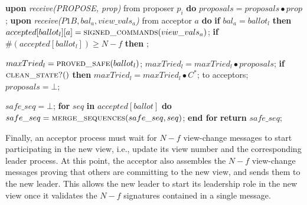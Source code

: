 \begin{algorithm}
\begin{multicols}{2}
\begin{algorithmic}[1]
			\State
			\State \textbf{upon} \textit{receive(PROPOSE, prop)} from proposer $p_i$ \textbf{do} 
			\State \hspace{\algorithmicindent} $proposals = proposals \bullet prop$;
			\State
			\State \textbf{upon} \textit{receive($P1B, bal_a,view\_vals_a$)} from acceptor $a$ \textbf{do}
			\State \hspace{\algorithmicindent} \textbf{if} $bal_a = ballot_l$ \textbf{then}
			\State \hspace{\algorithmicindent}\hspace{\algorithmicindent} $accepted[ballot_l][a] = \Call{signed\_commands}{view\_vals_a}$;
			\State
			\State \hspace{\algorithmicindent}\hspace{\algorithmicindent} \textbf{if} $\#(accepted[ballot_l]) \geq N-f$ \textbf{then} 
			\State \hspace{\algorithmicindent}\hspace{\algorithmicindent}\hspace{\algorithmicindent} ;
			
			\State
			\State $maxTried_l = \Call{proved\_safe}{ballot_l}$;
			\State $maxTried_l = maxTried_l \bullet proposals$;
			\State \textbf{if} $\Call{clean\_state?}{ }$ \textbf{then}
			\State \hspace{\algorithmicindent} $maxTried_l = maxTried_l \bullet C^*$;
			\State {} to acceptors;
			\State $proposals = \bot$;
			\EndFunction
			
			\State
			\State $safe\_seq = \bot$;
			\State \textbf{for} $seq$ \textbf{in} $accepted[ballot]$ \textbf{do}
			\State \hspace{\algorithmicindent} $safe\_seq = \Call{merge\_sequences}{safe\_seq, seq}$;
			\State \textbf{end for}
			\State \textbf{return} $safe\_seq$;
			\EndFunction		
		\end{algorithmic}
	\end{multicols}
	\vspace*{-.4cm}
\end{algorithm}

Finally, an acceptor process must wait for $N-f$ view-change messages to start participating in the new view, i.e., update its view number and the corresponding leader process. At this point, the acceptor also assembles the $N-f$ view-change messages proving that others are committing to the new view, and sends them to the new leader. This allows the new leader to start its leadership role in the new view once it validates the $N-f$ signatures contained in a single message.

